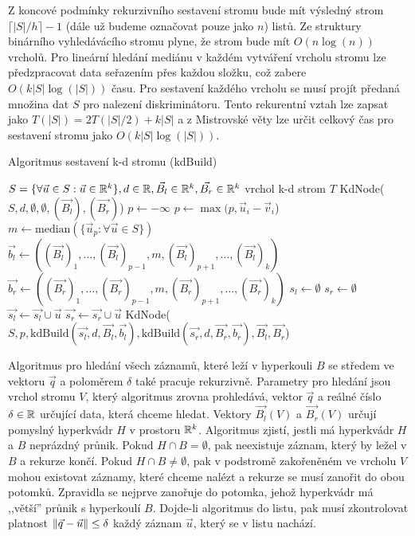 Z koncové podmínky rekurzivního sestavení stromu bude mít výsledný strom $\lceil |S| / h \rceil - 1$ (dále už budeme označovat pouze jako $n$) listů. Ze struktury binárního vyhledávácího stromu plyne, že strom bude mít $O(n\log(n))$ vrcholů. Pro lineární hledání mediánu v každém vytváření vrcholu stromu lze předzpracovat data seřazením přes každou složku, což zabere $O(k|S|\log(|S|))$ času. Pro sestavení každého vrcholu se musí projít předaná množina dat $S$ pro nalezení diskriminátoru. Tento rekurentní vztah lze zapsat jako $T(|S|) = 2T(|S|/2) + k|S|$ a z Mistrovské věty lze určit celkový čas pro sestavení stromu jako $O(k|S|\log(|S|))$.

\begin{algorithm}[h!]
  \caption{Algoritmus sestavení k-d stromu (kdBuild)}
  \label{algo:kd-tree-build}
  \begin{algorithmic}
    \REQUIRE $S = \{\forall \vec{u} \in S: \vec{u} \in \mathbb{R}^k\}, d \in \mathbb{R}, \vec{B_l} \in \mathbb{R}^k, \vec{B_r} \in \mathbb{R}^k$
    \ENSURE vrchol k-d strom $T$
      \RETURN KdNode($S, d, \emptyset, \emptyset, (\vec{B_l}), (\vec{B_r})$)
    \ENDIF
    \STATE $p \leftarrow -\infty$
        \STATE $p \leftarrow \max(p, \vec{u}_i - \vec{v}_i$)
      \ENDFOR
    \ENDFOR
    \STATE $m \leftarrow \textrm{median}(\{\vec{u}_p: \forall \vec{u} \in S\})$ 
    \STATE $\vec{b_l} \leftarrow ((\vec{B_l})_1, \ldots, (\vec{B_l})_{p-1}, m, (\vec{B_l})_{p+1}, \ldots, (\vec{B_l})_k)$
    \STATE $\vec{b_r} \leftarrow ((\vec{B_r})_1, \ldots, (\vec{B_r})_{p-1}, m, (\vec{B_r})_{p+1}, \ldots, (\vec{B_r})_k)$
    \STATE $s_l \leftarrow \emptyset$
    \STATE $s_r \leftarrow \emptyset$
        \STATE $\vec{s_l} \leftarrow \vec{s_l} \cup \vec{u}$
      \ELSE
        \STATE $\vec{s_r} \leftarrow \vec{s_r} \cup \vec{u}$
      \ENDIF
    \ENDFOR
    \RETURN KdNode($S, p, \textrm{kdBuild}(\vec{s_l}, d, \vec{B_l}, \vec{b_l}), \textrm{kdBuild}(\vec{s_r}, d, \vec{B_r}, \vec{b_r}), \vec{B_l}, \vec{B_r}$)
  \end{algorithmic}
\end{algorithm}

Algoritmus pro hledání všech záznamů, které leží v hyperkouli $B$ se středem ve vektoru $\vec{q}$ a poloměrem $\delta$ také pracuje rekurzivně. Parametry pro hledání jsou vrchol stromu $V$, který algoritmus zrovna prohledává, vektor $\vec{q}$ a reálné číslo $\delta \in \mathbb{R}$ určující data, která chceme hledat. Vektory $\vec{B_l}(V)$ a $\vec{B_r}(V)$ určují pomyslný hyperkvádr $H$ v prostoru $\mathbb{R}^k$. Algoritmus zjistí, jestli má hyperkvádr $H$ a $B$ neprázdný průnik. Pokud $H \cap B = \emptyset$, pak neexistuje záznam, který by ležel v $B$ a rekurze končí. Pokud $H \cap B \neq \emptyset$, pak v podstromě zakořeněném ve vrcholu $V$ mohou existovat záznamy, které chceme nalézt a rekurze se musí zanořit do obou potomků. Zpravidla se nejprve zanořuje do potomka, jehož hyperkvádr má ,,větší'' průnik s hyperkoulí $B$. Dojde-li algoritmus do listu, pak musí zkontrolovat platnost $\|\vec{q} - \vec{u}\| \leq \delta$ každý záznam $\vec{u}$, který se v listu nachází. 

